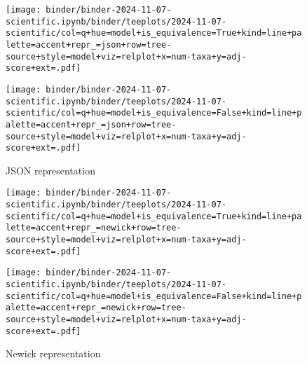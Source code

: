 \begin{figure*}

\begin{subfigure}{\textwidth}
\begin{minipage}[b]{0.7365\textwidth}
\texttt{[image: binder/binder-2024-11-07-scientific.ipynb/binder/teeplots/2024-11-07-scientific/col=q+hue=model+is\_equivalence=True+kind=line+palette=accent+repr\_=json+row=tree-source+style=model+viz=relplot+x=num-taxa+y=adj-score+ext=.pdf]}
\end{minipage}%
\begin{minipage}[b]{0.01\textwidth}
\end{minipage}
\begin{minipage}[b]{0.2535\textwidth}
\texttt{[image: binder/binder-2024-11-07-scientific.ipynb/binder/teeplots/2024-11-07-scientific/col=q+hue=model+is\_equivalence=False+kind=line+palette=accent+repr\_=json+row=tree-source+style=model+viz=relplot+x=num-taxa+y=adj-score+ext=.pdf]}
\end{minipage}
\caption{JSON representation}
\label{fig:models:json}
\end{subfigure}

\begin{subfigure}{\textwidth}
\begin{minipage}[b]{0.7365\textwidth}
\texttt{[image: binder/binder-2024-11-07-scientific.ipynb/binder/teeplots/2024-11-07-scientific/col=q+hue=model+is\_equivalence=True+kind=line+palette=accent+repr\_=newick+row=tree-source+style=model+viz=relplot+x=num-taxa+y=adj-score+ext=.pdf]}
\end{minipage}%
\begin{minipage}[b]{0.01\textwidth}
\end{minipage}
\begin{minipage}[b]{0.2535\textwidth}
\texttt{[image: binder/binder-2024-11-07-scientific.ipynb/binder/teeplots/2024-11-07-scientific/col=q+hue=model+is\_equivalence=False+kind=line+palette=accent+repr\_=newick+row=tree-source+style=model+viz=relplot+x=num-taxa+y=adj-score+ext=.pdf]}
\end{minipage}
\caption{Newick representation}
\label{fig:models:newick}
\end{subfigure}


\end{figure*}
